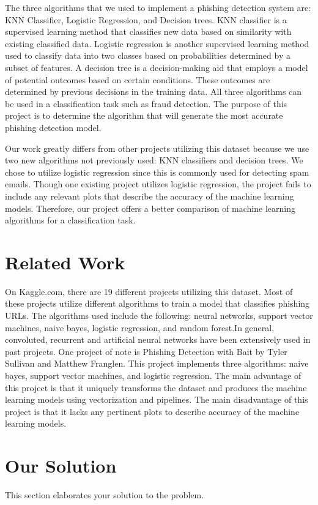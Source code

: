 \documentclass[conference]{IEEEtran}
\begin{document}
The three algorithms that we used to implement a phishing detection system are: KNN Classifier, Logistic Regression, and Decision trees. KNN classifier is a supervised learning method that classifies new data based on similarity with existing classified data.  Logistic regression is another supervised learning method used to classify data into two classes based on probabilities determined by a subset of features. A decision tree is a decision-making aid that employs a model of potential outcomes based on certain conditions. These outcomes are determined by previous decisions in the training data. All three algorithms can be used in a classification task such as fraud detection. The purpose of this project is to determine the algorithm that will generate the most accurate phishing detection model. 

Our work greatly differs from other projects utilizing this dataset because we use two new algorithms not previously used: KNN classifiers and decision trees. We chose to utilize logistic regression since this is commonly used for detecting spam emails. Though one existing project utilizes logistic regression, the project fails to include any relevant plots that describe the accuracy of the machine learning models. Therefore, our project offers a better comparison of machine learning algorithms for a classification task. 


\section{Related Work}
On Kaggle.com, there are 19 different projects utilizing this dataset. Most of these projects utilize different algorithms to train a model that classifies phishing URLs. The algorithms  used include the following: neural networks, support vector machines, naive bayes, logistic regression, and random forest.In general, convoluted, recurrent and artificial neural networks have been extensively used in past projects. One project of note is Phishing Detection with Bait by Tyler Sullivan and Matthew Franglen. This project implements three algorithms: naive bayes, support vector machines, and logistic regression. The main advantage of this project is that it uniquely transforms the dataset and produces the machine learning models using vectorization and pipelines. The main disadvantage of this project is that it lacks any pertinent plots to describe accuracy of  the machine learning models.   

\section{Our Solution}
This section elaborates your solution to the problem.
\end{document}
